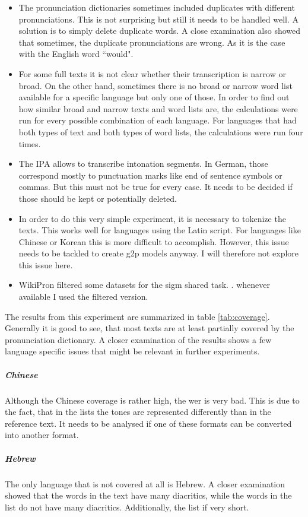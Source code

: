 \begin{itemize}
\item The pronunciation dictionaries sometimes included duplicates with different pronunciations. This is not surprising but still it needs to be handled well. A solution is to simply delete duplicate words. A close examination also showed that sometimes, the duplicate pronunciations are wrong. As it is the case with the English word ``would". 
\item For some full texts it is not clear whether their transcription is narrow or broad. On the other hand, sometimes there is no broad or narrow word list available for a specific language but only one of those. In order to find out how similar broad and narrow texts and word lists are, the calculations were run for every possible combination of each language. For languages that had both types of text and both types of word lists, the calculations were run four times. 
\item The IPA allows to transcribe intonation segments. In German, those correspond mostly to punctuation marks like end of sentence symbols or commas. But this must not be true for every case. It needs to be decided if those should be kept or potentially deleted.
\item In order to do this very simple experiment, it is necessary to tokenize the texts. This works well for languages using the Latin script. For languages like Chinese or Korean this is more difficult to accomplish. However, this issue needs to be tackled to create \ac{g2p} models anyway. I will therefore not explore this issue here.
\item WikiPron filtered some datasets for the \ac{sigm} shared task. . whenever available I used the filtered version.
\end{itemize}

The results from this experiment are summarized in table \ref{tab:coverage}. Generally it is good to see, that most texts are at least partially covered by the pronunciation dictionary. A closer examination of the results shows a few language specific issues that might be relevant in further experiments.


\subparagraph{Chinese} Although the Chinese coverage is rather high, the \ac{wer} is very bad. This is due to the fact, that in the lists the tones are represented differently than in the reference text. It needs to be analysed if one of these formats can be converted into another format. 
\subparagraph{Hebrew} The only language that is not covered at all is Hebrew. A closer examination showed that the words in the text have many diacritics, while the words in the list do not have many diacritics. Additionally, the list if very short. 

